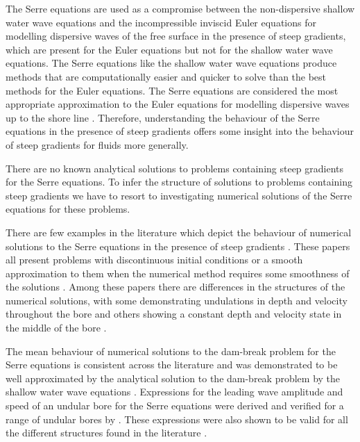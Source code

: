 \documentclass[times]{elsarticle}
\begin{document}
The Serre equations are used as a compromise between the non-dispersive shallow water wave equations and the incompressible inviscid Euler equations for modelling dispersive waves of the free surface in the presence of steep gradients, which are present for the Euler equations \cite{Mitsotakis-etal-2017} but not for the shallow water wave equations. The Serre equations like the shallow water wave equations produce methods \cite{Hank-etal-2010-2034,Zoppou-etal-2016,Zoppou-etal-2017} that are computationally easier and quicker to solve than the best methods for the Euler equations. The Serre equations are considered the most appropriate approximation to the Euler equations for modelling dispersive waves up to the shore line \cite{Bonneton-etal-2011-589,Bonneton-etal-2011-1479}. Therefore, understanding the behaviour of the Serre equations in the presence of steep gradients offers some insight into the behaviour of steep gradients for fluids more generally.

There are no known analytical solutions to problems containing steep gradients for the Serre equations. To infer the structure of solutions to problems containing steep gradients we have to resort to investigating numerical solutions of the Serre equations for these problems. 

There are few examples in the literature which depict the behaviour of numerical solutions to the Serre equations in the presence of steep gradients \cite{El-etal-2006,Hank-etal-2010-2034,Mitsotakis-etal-2014,Mitsotakis-etal-2017,Zoppou-etal-2016,Zoppou-etal-2017}. These papers all present problems with discontinuous initial conditions \cite{Hank-etal-2010-2034,Zoppou-etal-2016,Zoppou-etal-2017} or a smooth approximation to them when the numerical method requires some smoothness of the solutions \cite{El-etal-2006,Mitsotakis-etal-2014,Mitsotakis-etal-2017}. Among these papers there are differences in the structures of the numerical solutions, with some demonstrating undulations in depth and velocity throughout the bore \cite{El-etal-2006,Zoppou-etal-2016,Zoppou-etal-2017} and others showing a constant depth and velocity state in the middle of the bore \cite{Hank-etal-2010-2034,Mitsotakis-etal-2014,Mitsotakis-etal-2017}.

The mean behaviour of numerical solutions to the dam-break problem for the Serre equations is consistent across the literature \cite{El-etal-2006,Zoppou-etal-2016,Zoppou-etal-2017,Hank-etal-2010-2034,Mitsotakis-etal-2014,Mitsotakis-etal-2017} and was demonstrated to be well approximated by the analytical solution to the dam-break problem by the shallow water wave equations \cite{Hank-etal-2010-2034,Mitsotakis-etal-2014}. Expressions for the leading wave amplitude and speed of an undular bore for the Serre equations were derived and verified for a range of undular bores by \citet{El-etal-2006}. These expressions were also shown to be valid for all the different structures found in the literature \cite{El-etal-2006,Mitsotakis-etal-2014}.
\end{document}
